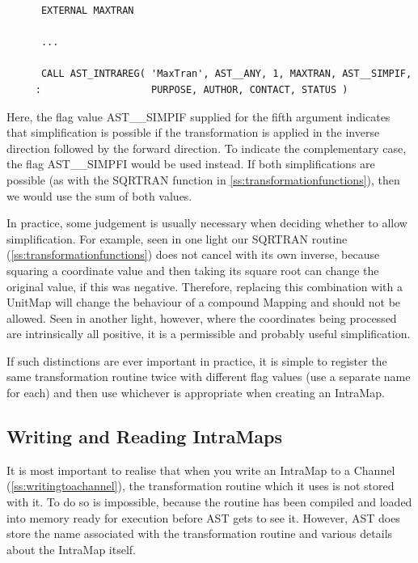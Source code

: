 \documentclass[twoside,11pt]{article}
\newcommand{\htmlref}[2]{#1}
\newcommand{\secref}[1]{\S\ref{#1}}
\renewcommand{\secref}[1]{\ref{#1}}
\begin{document}
\small
\begin{verbatim}
      EXTERNAL MAXTRAN

      ...

      CALL AST_INTRAREG( 'MaxTran', AST__ANY, 1, MAXTRAN, AST__SIMPIF,
     :                   PURPOSE, AUTHOR, CONTACT, STATUS )
\end{verbatim}
\normalsize

Here, the flag value AST\_\_SIMPIF supplied for the fifth argument
indicates that simplification is possible if the transformation is
applied in the inverse direction followed by the forward direction. To
indicate the complementary case, the flag AST\_\_SIMPFI would be used
instead. If both simplifications are possible (as with the SQRTRAN
function in \secref{ss:transformationfunctions}), then we would use
the sum of both values.

In practice, some judgement is usually necessary when deciding whether
to allow simplification. For example, seen in one light our SQRTRAN
routine (\secref{ss:transformationfunctions}) does not cancel with its
own inverse, because squaring a coordinate value and then taking its
square root can change the original value, if this was
negative. Therefore, replacing this combination with a UnitMap will
change the behaviour of a compound Mapping and should not be
allowed. Seen in another light, however, where the coordinates being
processed are intrinsically all positive, it is a permissible and
probably useful simplification.

If such distinctions are ever important in practice, it is simple to
register the same transformation routine twice with different flag
values (use a separate name for each) and then use whichever is
appropriate when creating an \htmlref{IntraMap}{IntraMap}.

\subsection{\label{ss:readingandwritingintramaps}Writing and Reading IntraMaps}

It is most important to realise that when you write an \htmlref{IntraMap}{IntraMap} to a
\htmlref{Channel}{Channel} (\secref{ss:writingtoachannel}), the transformation routine
which it uses is not stored with it. To do so is impossible, because
the routine has been compiled and loaded into memory ready for
execution before AST gets to see it. However, AST does store the name
associated with the transformation routine and various details about
the IntraMap itself.
\end{document}
